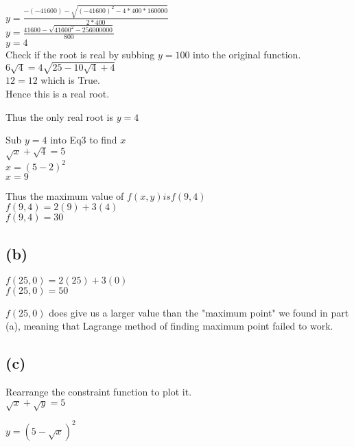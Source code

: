 \documentclass[11pt]{article}
\begin{document}
\(y = \frac {- (-41600)-\sqrt{(-41600)^2-4*400*160000}}{2*400}\)\\
\(y = \frac {41600-\sqrt{41600^2-256000000}}{800}\)\\
\(y = 4\)\\
Check if the root is real by subbing \(y = 100\) into the original
function.\\
\(6\sqrt{4} = 4\sqrt{25 - 10\sqrt{4} + 4}\)\\
\(12 = 12\) which is True.\\
Hence this is a real root.

Thus the only real root is \(y = 4\)

Sub \(y = 4\) into Eq3 to find \(x\)\\
\(\sqrt{x} + \sqrt{4} = 5\)\\
\(x = (5 - 2)^2\)\\
\(x = 9\)

Thus the maximum value of \(f(x,y) is f(9,4)\)\\
\(f(9,4) = 2(9) + 3(4)\)\\
\(f(9,4) = 30\)

    \subsection{(b)}\label{b}

\(f(25,0) = 2(25) + 3(0)\)\\
\(f(25,0) = 50\)

\(f(25,0)\) does give us a larger value than the "maximum point" we
found in part (a), meaning that Lagrange method of finding maximum point
failed to work.

    \subsection{(c)}\label{c}

Rearrange the constraint function to plot it.\\
\(\sqrt{x} + \sqrt{y} = 5\)

\(y = (5-\sqrt{x})^2\)
\end{document}

